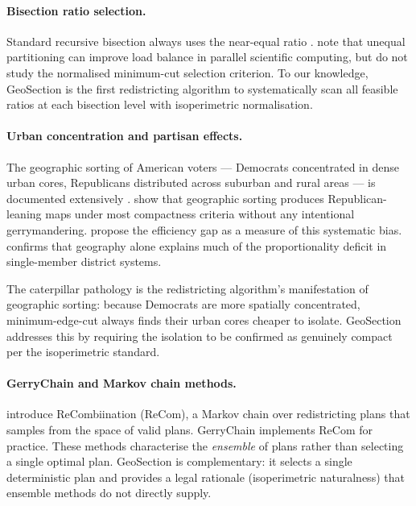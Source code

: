 \paragraph{Bisection ratio selection.}
Standard recursive bisection always uses the near-equal ratio \citep{karypis1998b}.
\citet{hendrickson1995} note that unequal partitioning can improve load balance
in parallel scientific computing, but do not study the normalised minimum-cut
selection criterion.
To our knowledge, GeoSection is the first redistricting algorithm to
systematically scan all feasible ratios at each bisection level with
isoperimetric normalisation.

\paragraph{Urban concentration and partisan effects.}
The geographic sorting of American voters --- Democrats concentrated in
dense urban cores, Republicans distributed across suburban and rural areas
--- is documented extensively \citep{rodden2019,chen2013}.
\citet{chen2013} show that geographic sorting produces Republican-leaning maps
under most compactness criteria without any intentional gerrymandering.
\citet{stephanopoulos2015} propose the efficiency gap as a measure of this
systematic bias.
\citet{mcghee2014} confirms that geography alone explains much of the
proportionality deficit in single-member district systems.

The caterpillar pathology is the redistricting algorithm's manifestation of
geographic sorting: because Democrats are more spatially concentrated,
minimum-edge-cut always finds their urban cores cheaper to isolate.
GeoSection addresses this by requiring the isolation to be confirmed
as genuinely compact per the isoperimetric standard.

\paragraph{GerryChain and Markov chain methods.}
\citet{deford2019} introduce ReCombiination (ReCom), a Markov chain over
redistricting plans that samples from the space of valid plans.
GerryChain \citep{metric2018} implements ReCom for practice.
These methods characterise the \emph{ensemble} of plans rather than
selecting a single optimal plan.
GeoSection is complementary: it selects a single deterministic plan
and provides a legal rationale (isoperimetric naturalness) that ensemble
methods do not directly supply.

